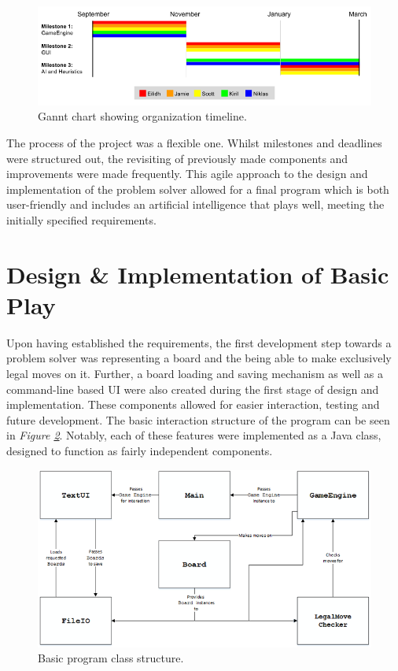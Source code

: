 \documentclass{l3proj}
\begin{document}
\begin{figure}[H]
\centering
\includegraphics[scale=0.5]{Images/GanntChart.png}
\caption{Gannt chart showing organization timeline.}
\label{gantt}
\end{figure}

The process of the project was a flexible one. Whilst milestones and deadlines were structured out, the revisiting of previously made components and improvements were made frequently. This agile approach to the design and implementation of the problem solver allowed for a final program which is both user-friendly and includes an artificial intelligence that plays well, meeting the initially specified requirements.

\section{Design \& Implementation of Basic Play}

Upon having established the requirements, the first development step towards a problem solver was representing a board and the being able to make exclusively legal moves on it. Further, a board loading and saving mechanism as well as a command-line based UI were also created during the first stage of design and implementation. These components allowed for easier interaction, testing and future development. The basic interaction structure of the program can be seen in \textit{Figure  \ref{fig:basic_program}}. Notably, each of these features were implemented as a Java class, designed to function as fairly independent components.

\begin{figure}[H]
	\centering
	\includegraphics[scale=1]{Images/S33Diagram.png}
	\caption{Basic program class structure.} 
	\label{fig:basic_program}
\end{figure}
\end{document}
